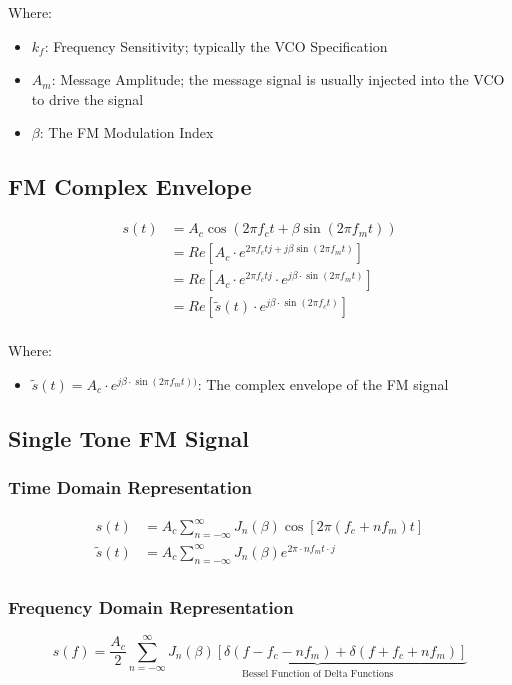 \documentclass[12pt]{article}
\begin{document}
\noindent Where:
\begin{itemize}
	\item $k_f$: Frequency Sensitivity; typically the VCO Specification
	\item $A_m$: Message Amplitude; the message signal is usually injected into the VCO to drive the signal
	\item $\beta$: The FM Modulation Index
\end{itemize}

\subsection{FM Complex Envelope}
\begin{align*}
	s(t) & = A_c \cos(2\pi f_c t + \beta \sin(2 \pi f_m t))                                 \\
	     & = Re\left[A_c \cdot e^{2\pi f_c tj + j\beta\sin(2\pi f_m t)}\right]              \\
	     & = Re\left[A_c \cdot e^{2\pi f_c tj} \cdot e^{j\beta\cdot\sin(2\pi f_m t)}\right] \\
	     & = Re\left[\tilde{s}(t)\cdot e^{j\beta\cdot\sin(2\pi f_c t)}\right]               \\
\end{align*}

\noindent Where:
\begin{itemize}
	\item $\tilde{s}(t) = A_c \cdot e^{j \beta\cdot\sin(2\pi f_m t))}$: The complex envelope of the FM signal
\end{itemize}

\subsection{Single Tone FM Signal}
\subsubsection{Time Domain Representation}
\begin{align*}
	s(t)         & = A_c \sum_{n=-\infty}^{\infty}  J_n(\beta)\cos\left[2 \pi (f_c + n f_m) t\right] \\
	\tilde{s}(t) & = A_c \sum_{n=-\infty}^{\infty} J_n(\beta) e^{2 \pi \cdot n f_m t \cdot j}        \\
\end{align*}
\subsubsection{Frequency Domain Representation}
\[
	s(f) = \frac{A_c}{2} \sum_{n=-\infty}^{\infty} \underbrace{J_n(\beta)\left[\delta(f-f_c-n f_m) + \delta(f+f_c+n f_m)\right]}_{\text{Bessel Function of Delta Functions}}
\]
\end{document}
